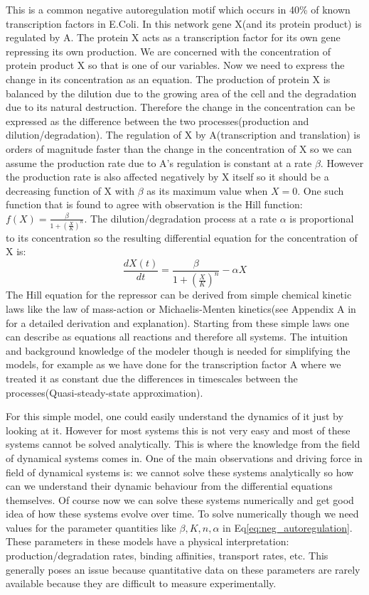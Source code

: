 \documentclass[12pt,a4paper,titlepage]{article}
\begin{document}
This is a common negative autoregulation motif which occurs in 40\% of known transcription factors in E.Coli\cite{rosenfeld2002negative}. In this network gene X(and its protein product) is regulated by A. The protein X acts as a transcription factor for its own gene repressing its own production. We are concerned with the concentration of protein product X so that is one of our variables. Now we need to express the change in its concentration as an equation. The production of protein X is balanced by the dilution due to the growing area of the cell and the degradation due to its natural destruction. Therefore the change in the concentration can be expressed as the difference between the two processes(production and dilution/degradation).  The regulation of X by A(transcription and translation) is orders of magnitude faster than the change in the concentration of X so we can assume the production rate due to A's regulation is constant at a rate $\beta$. However the production rate is also affected negatively by X itself so it should be a decreasing function of X with $\beta$ as its maximum value when $X=0$. One such function that is found to agree with observation is the Hill function: $ f(X) = \frac{\beta}{1 + \left(\frac{X}{K}\right)^n}$. The dilution/degradation process at a rate $\alpha$ is proportional to its concentration so the resulting differential equation for the concentration of X is:
\begin{equation}
\frac{dX(t)}{dt} = \frac{\beta}{1 + \left(\frac{X}{K}\right)^n} - \alpha X
\label{eq:neg_autoregulation}
\end{equation}
The Hill equation for the repressor can be derived from simple chemical kinetic laws like the law of mass-action\cite{} or Michaelis-Menten kinetics\cite{}(see Appendix A in \cite{alon2007introduction} for a detailed derivation and explanation). Starting from these simple laws one can describe as equations all reactions and therefore all systems. The intuition and background knowledge of the modeler though is needed for simplifying the models, for example as we have done for the transcription factor A where we treated it as constant due the differences in timescales between the processes(Quasi-steady-state approximation). 

For this simple model, one could easily understand the dynamics of it just by looking at it. However for most systems this is not very easy and most of these systems cannot be solved analytically. This is where the knowledge from the field of dynamical systems comes in. One of the main observations and driving force in field of dynamical systems is: we cannot solve these systems analytically so how can we understand their dynamic behaviour from the differential equations themselves. Of course now we can solve these systems numerically and get  good idea of how these systems evolve over time. To solve numerically though we need values for the parameter quantities like $\beta, K, n, \alpha$ in Eq\ref{eq:neg_autoregulation}. These parameters in these models have a physical interpretation: production/degradation rates, binding affinities, transport rates, etc. This generally poses an issue because quantitative data on these parameters are rarely available because they are difficult to measure experimentally. 
\end{document}
